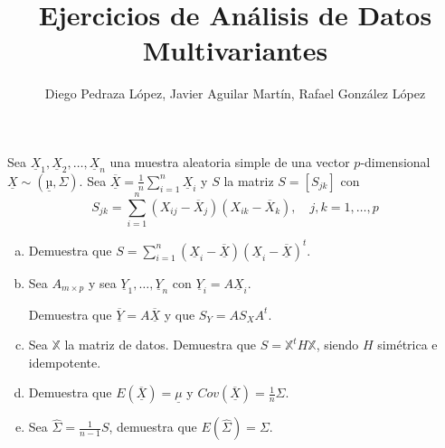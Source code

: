 \documentclass[twoside]{article}
\newcommand{\media}[1]{{\overline{#1}}}
\newcommand{\muestra}[1]{{\underline{#1}}}
\newcommand{\m}[1]{{\muestra{#1}}}
\newcommand{\mX}{{\muestra{X}}}
\begin{document}
\title{Ejercicios de Análisis de Datos Multivariantes}
\author{Diego Pedraza López, Javier Aguilar Martín, Rafael González López}
\maketitle

\begin{ejercicio}{1.1}
Sea $\mX_1, \mX_2, \dots, \mX_n$ una muestra aleatoria simple de una vector $p$-dimensional $\mX \sim (\m{µ},Σ)$.
Sea $\media{\m{X}} = \frac{1}{n}\sum_{i=1}^n \m{X}_i$ y $S$ la matriz $S = [S_{jk}]$ con
\[ S_{jk} = \sum_{i=1}^n (X_{ij} - \media{X}_j)(X_{ik}-\media{X}_k), \quad j,k=1,\dots,p\]
\begin{enumerate}[(a)]
\item Demuestra que $S = \sum_{i=1}^n (\mX_i-\media{\m{X}})(\mX_i-\media{\m{X}})^t$.
\item Sea $A_{m\times p}$ y sea $\m{Y}_1,\dots,\m{Y}_n$ con $\m{Y}_i = A \m{X}_i$.

Demuestra que $\media{\m{Y}}=A \media{\mX}$ y que $S_Y = A S_X A^t$.
\item Sea $\mathbb{X}$ la matriz de datos. Demuestra que $S = \mathbb{X}^t H \mathbb{X}$, siendo $H$ simétrica e idempotente.
\item Demuestra que $E(\media{\mX}) = \m{μ}$ y $Cov(\media{\mX}) = \frac{1}{n} Σ$.
\item Sea $\hat{Σ} = \frac{1}{n-1}S$, demuestra que $E 	(\hat{Σ}) = Σ$.
\end{enumerate}
\end{ejercicio}
\end{document}
